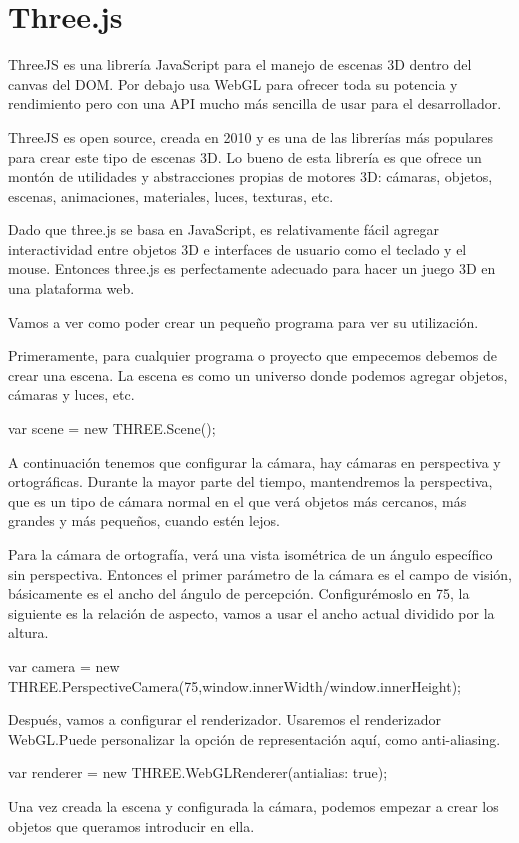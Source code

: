 \documentclass[a4paper, 12pt]{book}
\begin{document}
\section{Three.js} 
\label{sec:Three}


ThreeJS es una librería JavaScript para el manejo de escenas 3D dentro del canvas del DOM. Por debajo usa WebGL para ofrecer toda su potencia y rendimiento pero con una API mucho más sencilla de usar para el desarrollador.
\newpage

ThreeJS es open source, creada en 2010 y es una de las librerías más populares para crear este tipo de escenas 3D.
Lo bueno de esta librería es que ofrece un montón de utilidades y abstracciones propias de motores 3D: cámaras, objetos, escenas, animaciones, materiales, luces, texturas, etc.

Dado que three.js se basa en JavaScript, es relativamente fácil agregar interactividad entre objetos 3D e interfaces de usuario como el teclado y el mouse. Entonces three.js es perfectamente adecuado para hacer un juego 3D en una plataforma web.

Vamos a ver como poder crear un pequeño programa para ver su utilización.

Primeramente, para cualquier programa o proyecto que empecemos debemos de crear una escena. La escena es como un universo donde podemos agregar objetos, cámaras y luces, etc.
\begin{center}
var scene = new THREE.Scene();
\end{center}
A continuación tenemos que configurar la cámara, hay cámaras en perspectiva y ortográficas. Durante la mayor parte del tiempo, mantendremos la perspectiva, que es un tipo de cámara normal en el que verá objetos más cercanos, más grandes y más pequeños, cuando estén lejos.

Para la cámara de ortografía, verá una vista isométrica de un ángulo específico sin perspectiva.
Entonces el primer parámetro de la cámara es el campo de visión, básicamente es el ancho del ángulo de percepción. Configurémoslo en 75, la siguiente es la relación de aspecto, vamos a usar el ancho actual dividido por la altura.
\begin{center}

var camera = new THREE.PerspectiveCamera(75,window.innerWidth/window.innerHeight);
\end{center}

Después, vamos a configurar el renderizador. Usaremos el renderizador WebGL.Puede personalizar la opción de representación aquí, como anti-aliasing. 
\begin{center}
var renderer = new THREE.WebGLRenderer({antialias: true});

\end{center}
Una vez creada la escena y configurada la cámara, podemos empezar a crear los objetos que queramos introducir en ella. 
\end{document}

